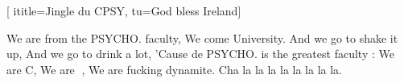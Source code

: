  [
ititle={Jingle du CPSY},
tu={God bless Ireland}]

\beginverse
We are from the PSYCHO. faculty,
We come University.
And we go to shake it up,
And we go to drink a lot,
'Cause de PSYCHO. is the greatest faculty :
We are C,
We are ,
We are fucking dynamite.
Cha la la la la la la la la.
\endverse
\endsong